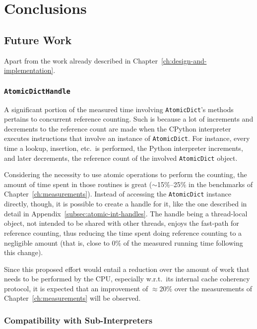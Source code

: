 \chapter{Conclusions}\label{ch:conclusions}

\section{Future Work}\label{sec:future-work}

Apart from the work already described in Chapter~\ref{ch:design-and-implementation}.

\subsection{\texttt{AtomicDictHandle}}\label{subsec:atomicdicthandle}

A significant portion of the measured time involving \texttt{AtomicDict}'s methods pertains to concurrent reference counting.
Such is because a lot of increments and decrements to the reference count are made when the CPython interpreter executes instructions that involve an instance of \texttt{AtomicDict}.
For instance, every time a lookup, insertion, etc.\ is performed, the Python interpreter increments, and later decrements, the reference count of the involved \texttt{AtomicDict} object.

Considering the necessity to use atomic operations to perform the counting, the amount of time spent in those routines is great ($\sim$15\%--25\% in the benchmarks of Chapter~\ref{ch:measurements}).
Instead of accessing the \texttt{AtomicDict} instance directly, though, it is possible to create a handle for it, like the one described in detail in Appendix~\ref{subsec:atomic-int-handles}.
The handle being a thread-local object, not intended to be shared with other threads, enjoys the fast-path for reference counting, thus reducing the time spent doing reference counting to a negligible amount (that is, close to 0\% of the measured running time following this change).

Since this proposed effort would entail a reduction over the amount of work that needs to be performed by the CPU, especially w.r.t.\ its internal cache coherency protocol, it is expected that an improvement of $\approx$20\% over the measurements of Chapter~\ref{ch:measurements} will be observed.


\subsection{Compatibility with Sub-Interpreters}\label{subsec:compatibility-with-sub-interpreters}

